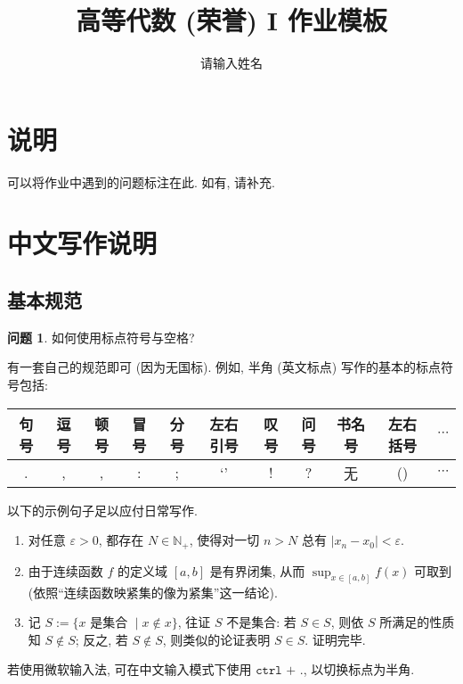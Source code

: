 \documentclass[11pt]{ctexart}
\title{高等代数 (荣誉) I 作业模板}
\author{请输入姓名}
\theoremstyle{definition}
\newtheorem{qqq}{问题}[section]
\numberwithin{equation}{section}
\theoremstyle{definition}
\theoremstyle{remark}
\begin{document}
\maketitle

\section{说明}

可以将作业中遇到的问题标注在此. 如有, 请补充.

\tableofcontents

\newpage


\section{中文写作说明}

\subsection{基本规范}

\begin{qqq}
    如何使用标点符号与空格?
    \begin{aaa}
        有一套自己的规范即可 (因为无国标). 例如, 半角 (英文标点) 写作的基本的标点符号包括:
        \begin{table}[h]
            \begin{tabular}{|c|c|c|c|c|c|c|c|c|c|c|}
                \hline
                句号 & 逗号 & 顿号 & 冒号 & 分号 & 左右引号 & 叹号 & 问号 & 书名号 & 左右括号 & $\cdots $ \\ \hline
                .    & ,    & ,    & :    & ;    & `'       & !    & ?    & 无     & ()       & $\cdots $ \\ \hline
            \end{tabular}
        \end{table}

        以下的示例句子足以应付日常写作.
        \begin{enumerate}
            \item 对任意 $\varepsilon >0$, 都存在 $N\in \mathbb N_+$, 使得对一切 $n >N$ 总有 $|x_n-x_0|< \varepsilon$.
            \item 由于连续函数 $f$ 的定义域 $[a,b]$ 是有界闭集, 从而 $\sup_{x\in [a,b]} f(x)$ 可取到 (依照``连续函数映紧集的像为紧集''这一结论).
            \item 记 $S:=\{x\text{ 是集合 }\mid x\notin x\}$, 往证 $S$ 不是集合: 若 $S\in S$, 则依 $S$ 所满足的性质知 $S\notin S$; 反之, 若 $S\notin S$, 则类似的论证表明 $S\in S$. 证明完毕.
        \end{enumerate}
        \begin{pinked}
            若使用微软输入法, 可在中文输入模式下使用 $\texttt{ctrl + .}$, 以切换标点为半角.
        \end{pinked}
    \end{aaa}
\end{qqq}
\end{document}

